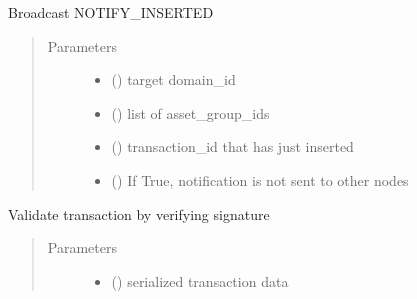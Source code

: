\documentclass[letterpaper,10pt,english]{sphinxmanual}
\begin{document}
\begin{fulllineitems}
\begin{fulllineitems}
\end{fulllineitems}


\begin{fulllineitems}
\label{\detokenize{bbc1.core.bbc_core:bbc1.core.bbc_core.BBcCoreService.send_inserted_notification}}
Broadcast NOTIFY\_INSERTED
\begin{quote}\begin{description}
\item[{Parameters}] \leavevmode\begin{itemize}
\item {} 
 () \textendash{} target domain\_id

\item {} 
 () \textendash{} list of asset\_group\_ids

\item {} 
 () \textendash{} transaction\_id that has just inserted

\item {} 
 () \textendash{} If True, notification is not sent to other nodes

\end{itemize}

\end{description}\end{quote}

\end{fulllineitems}


\begin{fulllineitems}
\label{\detokenize{bbc1.core.bbc_core:bbc1.core.bbc_core.BBcCoreService.validate_transaction}}
Validate transaction by verifying signature
\begin{quote}\begin{description}
\item[{Parameters}] \leavevmode\begin{itemize}
\item {} 
 () \textendash{} serialized transaction data


\end{itemize}
\end{description}
\end{quote}
\end{fulllineitems}
\end{fulllineitems}
\end{document}
